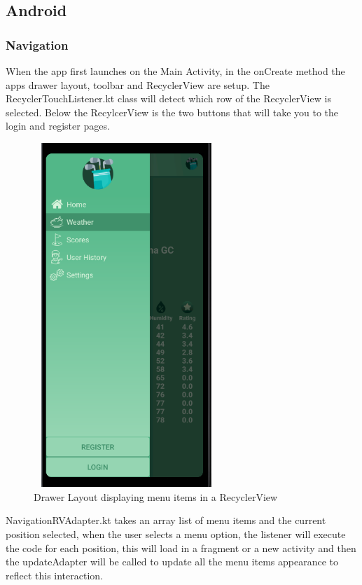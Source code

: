 \subsection{Android}
\subsubsection{Navigation}
When the app first launches on the Main Activity, in the onCreate method the apps drawer layout, toolbar and RecyclerView are setup. The RecyclerTouchListener.kt class will detect which row of the RecyclerView is selected. Below the RecylcerView is the two buttons that will take you to the login and register pages.
\begin{figure}[H]
    \centering
    \includegraphics[width=7cm, height = 13cm]{img/drawer_layout.PNG}
    \caption{Drawer Layout displaying menu items in a RecyclerView}
    \label{fig:altas config}
\end{figure}
NavigationRVAdapter.kt takes an array list of menu items and the current position selected, when the user selects a menu option, the listener will execute the code for each position, this will load in a fragment or a new activity and then the updateAdapter will be called to update all the menu items appearance to reflect this interaction.  

